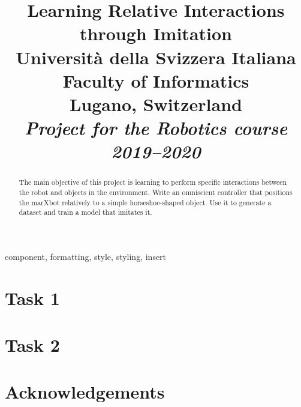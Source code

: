 \documentclass[conference]{IEEEtran}
\begin{document}
\title{Learning Relative Interactions through Imitation \\ \vspace{0.5\baselineskip}
{
	\large {Università della Svizzera Italiana}\\
	{Faculty of Informatics} \\
	Lugano, Switzerland \\
	\textit{Project for the Robotics course 2019--2020}\\
}
}

\author{
\and
{}
}

\maketitle

\begin{abstract}
The main objective of this project is learning to perform specific interactions between the robot and objects in the 
environment.
Write an omniscient controller that positions the marXbot relatively to a simple horseshoe-shaped object. Use it to 
generate a dataset and train a model that imitates it.
\end{abstract}

\begin{IEEEkeywords}
component, formatting, style, styling, insert
\end{IEEEkeywords}



\section{Task 1}






\section{Task 2}


\section*{Acknowledgements}




\end{document}
